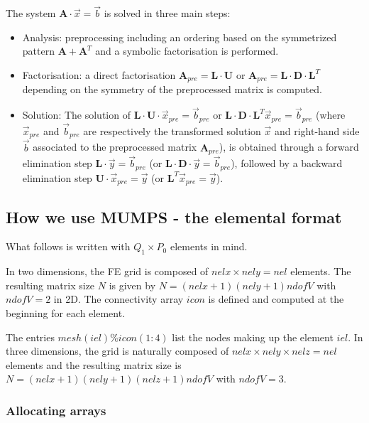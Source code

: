 The system ${\bm A}\cdot{\vec x} = {\vec b}$ is solved in three main steps:
\begin{itemize}
\item Analysis: preprocessing including an 
ordering based on the symmetrized pattern ${\bm A} + {\bm A}^T$ 
and a symbolic factorisation is performed. 

\item Factorisation: a direct factorisation ${\bm A}_{pre} = {\bm L}\cdot{\bm U}$ 
or ${\bm A}_{pre} = {\bm L}\cdot{\bm D}\cdot {\bm L}^T$ depending on 
the symmetry of the preprocessed matrix is computed. 

\item Solution:
The solution of ${\bm L}\cdot{\bm U}\cdot{\vec x}_{pre} = {\vec b}_{pre}$ 
or ${\bm L}\cdot{\bm D}\cdot{\bm L}^T {\vec x}_{pre} = {\vec b}_{pre}$ (where 
${\vec x}_{pre}$ and ${\vec b}_{pre}$ are respectively the transformed solution 
${\vec x}$ and right-hand side ${\vec b}$ associated to the preprocessed matrix 
${\bm A}_{pre}$), is obtained through a forward elimination step
${\bm L}\cdot{\vec y}={\vec b}_{pre}$ (or ${\bm L}\cdot{\bm D}\cdot{\vec y}={\vec b}_{pre}$), 
followed by a backward elimination step
${\bm U}\cdot{\vec x}_{pre} ={\vec y}$ (or ${\bm L}^T{\vec x}_{pre} ={\vec y}$). 

\end{itemize}



\subsection{How we use MUMPS - the elemental format}

What follows is written with $Q_1\times P_0$ elements in mind. 

In two dimensions, the FE grid is composed of $nelx \times nely=nel$ elements. 
The resulting matrix size $N$ is given by $N=(nelx+1)(nely+1)ndofV$ with $ndofV=2$ in 2D.
The connectivity array $icon$ is defined and computed at the beginning for each element. 

The entries $mesh(iel)\%icon(1:4)$ list the nodes making up the element $iel$.
In three dimensions, the grid is naturally composed of 
$nelx \times nely \times nelz = nel$ elements and the 
resulting matrix size is $N=(nelx+1)(nely+1)(nelz+1)ndofV$ with $ndofV=3$.

\subsubsection{Allocating arrays}

